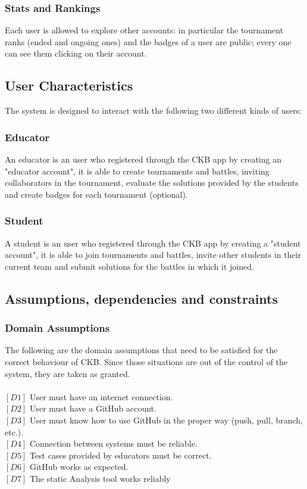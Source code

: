 \documentclass{article}
\begin{document}
\subsubsection{Stats and Rankings}
Each user is allowed to explore other accounts: in particular the tournament ranks (ended and ongoing ones) and the badges of a user are public; every one can see them clicking on their account.

\subsection{User Characteristics}
The system is designed to interact with the following two different kinds of users:
\subsubsection{Educator}
An educator is an user who registered through the CKB app by creating an "educator account", it is able to create tournaments and battles, inviting collaborators in the tournament, evaluate the solutions provided by the students and create badges for each tournament (optional).
\subsubsection{Student}
A student is an user who registered through the CKB app by creating a "student account", it is able to join tournaments and battles, invite other students in their current team and submit solutions for the battles in which it joined.
\subsection{Assumptions, dependencies and constraints}

\subsubsection{Domain Assumptions}
The following are the domain assumptions that need to be satisfied for the correct behaviour of CKB. Since those situations are out of the control of the system, they are taken as granted.\\\\
$[D1]$ User must have an internet connection.\\
$[D2]$ User must have a GitHub account.\\
$[D3]$ User must know how to use GitHub in the proper way (push, pull, branch, etc.).\\
$[D4]$ Connection between systems must be reliable.\\
$[D5]$ Test cases provided by educators must be correct.\\
$[D6]$ GitHub works as expected.\\
$[D7]$ The static Analysis tool works reliably\\
\end{document}
